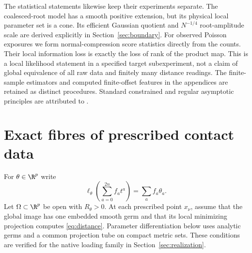 The statistical statements likewise keep their experiments separate. The coalesced-root model has a smooth positive extension, but its physical local parameter set is a cone. Its efficient Gaussian quotient and $N^{-1/4}$ root-amplitude scale are derived explicitly in Section~\ref{sec:boundary}. For observed Poisson exposures we form normal-compression score statistics directly from the counts. Their local information loss is exactly the loss of rank of the product map. This is a local likelihood statement in a specified target subexperiment, not a claim of global equivalence of all raw data and finitely many distance readings. The finite-sample estimators and computed finite-offset features in the appendices are retained as distinct procedures. Standard constrained and regular asymptotic principles are attributed to \cite{Geyer,vdV}.

\section{Exact fibres of prescribed contact data}\label{sec:contact}
For $\theta\in\R^p$ write
\[
 \ell_\theta\left(\sum_{a=0}^{2n}f_at^a\right)=\sum_a f_a\theta_a.
\]
Let $\Omega\subset\R^p$ be open with $R_\theta>0$. At each prescribed point $x_\nu$, assume that the global image has one embedded smooth germ and that its local minimizing projection computes \eqref{eq:distance}. Parameter differentiation below uses analytic germs and a common projection tube on compact metric sets. These conditions are verified for the native loading family in Section~\ref{sec:realization}.

